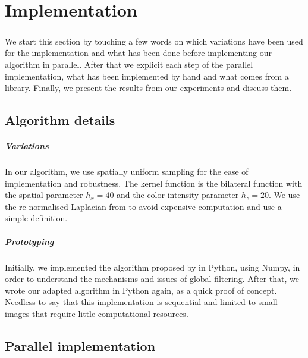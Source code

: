 \chapter{Implementation}

\paragraph{}
We start this section by touching a few words on which variations have been used for the implementation and what has been done before implementing our algorithm in parallel.
After that we explicit each step of the parallel implementation, what has been implemented by hand and what comes from a library.
Finally, we present the results from our experiments and discuss them.

\section{Algorithm details}

\paragraph{Variations}
In our algorithm, we use spatially uniform sampling for the ease of implementation and robustness.
The kernel function is the bilateral function with the spatial parameter \(h_x = 40\) and the color intensity parameter \(h_z = 20\).
We use the re-normalised Laplacian from \cite{milanfar_new_2016} to avoid expensive computation and use a simple definition.

\paragraph{Prototyping}
Initially, we implemented the algorithm proposed by \cite{glide_2014} in Python, using Numpy, in order to understand the mechanisms and issues of global filtering.
After that, we wrote our adapted algorithm in Python again, as a quick proof of concept.
Needless to say that this implementation is sequential and limited to small images that require little computational resources.

\section{Parallel implementation}

